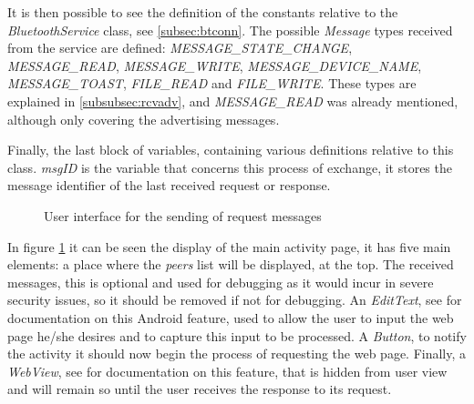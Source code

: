 It is then possible to see the definition of the constants relative to the \textit{BluetoothService} class, see \ref{subsec:btconn}. The possible \textit{Message} types received from the service are defined: \textit{MESSAGE\_STATE\_CHANGE}, \textit{MESSAGE\_READ}, \textit{MESSAGE\_WRITE}, \textit{MESSAGE\_DEVICE\_NAME}, \textit{MESSAGE\_TOAST}, \textit{FILE\_READ} and \textit{FILE\_WRITE}. These types are explained in \ref{subsubsec:rcvadv}, and \textit{MESSAGE\_READ} was already mentioned, although only covering the advertising messages.

Finally, the last block of variables, containing various definitions relative to this class. \textit{msgID} is the variable that concerns this process of exchange, it stores the message identifier of the last received request or response.

\begin{figure}[ht]
   \noindent{}
	\caption{\label{fig:initScreen} User interface for the sending of request messages}
\end{figure}

In figure \ref{fig:initScreen} it can be seen the display of the main activity page, it has five main elements: a place where the \textit{peers} list will be displayed, at the top. The received messages, this is optional and used for debugging as it would incur in severe security issues, so it should be removed if not for debugging. An \textit{EditText}, see \cite{edittext} for documentation on this Android feature, used to allow the user to input the web page he/she desires and to capture this input to be processed. A \textit{Button}, to notify the activity it should now begin the process of requesting the web page. Finally, a \textit{WebView}, see \cite{webview} for documentation on this feature, that is hidden from user view and will remain so until the user receives the response to its request.

